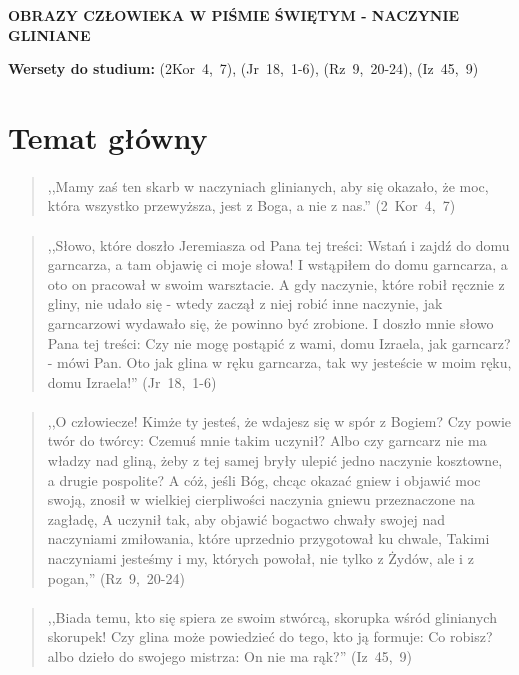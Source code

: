 \documentclass[10pt,a4paper,oneside]{article}
\begin{document}
\centerline{\textbf{\MakeUppercase{Obrazy człowieka w Piśmie Świętym - naczynie gliniane}}}
\begin{center}
\textbf{Wersety do studium:} 
\mbox{(2Kor 4, 7)}, \mbox{(Jr 18, 1-6)}, \mbox{(Rz 9, 20-24)}, \mbox{(Iz 45, 9)}
\end{center}
\section{Temat główny}
\paragraph{}
\begin{quote}
,,Mamy zaś ten skarb w naczyniach glinianych, aby się okazało, że moc, która wszystko przewyższa, jest z Boga, a nie z nas.'' \mbox{(2 Kor 4, 7)}
\end{quote}
\paragraph{}
\begin{quote}
,,Słowo, które doszło Jeremiasza od Pana tej treści: Wstań i zajdź do domu garncarza, a tam objawię ci moje słowa! I wstąpiłem do domu garncarza, a oto on pracował w swoim warsztacie. A gdy naczynie, które robił ręcznie z gliny, nie udało się - wtedy zaczął z niej robić inne naczynie, jak garncarzowi wydawało się, że powinno być zrobione. I doszło mnie słowo Pana tej treści: Czy nie mogę postąpić z wami, domu Izraela, jak garncarz? - mówi Pan. Oto jak glina w ręku garncarza, tak wy jesteście w moim ręku, domu Izraela!'' \mbox{(Jr 18, 1-6)}
\end{quote}
\paragraph{}
\begin{quote}
,,O człowiecze! Kimże ty jesteś, że wdajesz się w spór z Bogiem? Czy powie twór do twórcy: Czemuś mnie takim uczynił? Albo czy garncarz nie ma władzy nad gliną, żeby z tej samej bryły ulepić jedno naczynie kosztowne, a drugie pospolite? A cóż, jeśli Bóg, chcąc okazać gniew i objawić moc swoją, znosił w wielkiej cierpliwości naczynia gniewu przeznaczone na zagładę, A uczynił tak, aby objawić bogactwo chwały swojej nad naczyniami zmiłowania, które uprzednio przygotował ku chwale, Takimi naczyniami jesteśmy i my, których powołał, nie tylko z Żydów, ale i z pogan,'' \mbox{(Rz 9, 20-24)}
\end{quote}
\paragraph{}
\begin{quote}
,,Biada temu, kto się spiera ze swoim stwórcą, skorupka wśród glinianych skorupek! Czy glina może powiedzieć do tego, kto ją formuje: Co robisz? albo dzieło do swojego mistrza: On nie ma rąk?'' \mbox{(Iz 45, 9)}
\end{quote}
\end{document}
